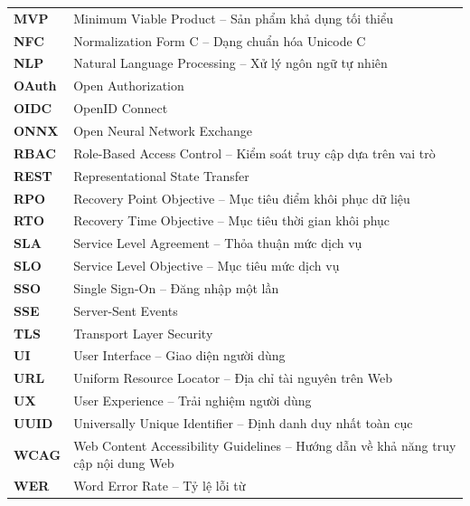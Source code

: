 \begin{longtable}{>{\bfseries}p{3cm} p{11cm}}
MVP      & Minimum Viable Product -- Sản phẩm khả dụng tối thiểu \\[4pt]
NFC      & Normalization Form C -- Dạng chuẩn hóa Unicode C \\[4pt]
NLP      & Natural Language Processing -- Xử lý ngôn ngữ tự nhiên \\[4pt]
OAuth    & Open Authorization \\[4pt]
OIDC     & OpenID Connect \\[4pt]
ONNX     & Open Neural Network Exchange \\[4pt]
RBAC     & Role-Based Access Control -- Kiểm soát truy cập dựa trên vai trò \\[4pt]
REST     & Representational State Transfer \\[4pt]
RPO      & Recovery Point Objective -- Mục tiêu điểm khôi phục dữ liệu \\[4pt]
RTO      & Recovery Time Objective -- Mục tiêu thời gian khôi phục \\[4pt]
SLA      & Service Level Agreement -- Thỏa thuận mức dịch vụ \\[4pt]
SLO      & Service Level Objective -- Mục tiêu mức dịch vụ \\[4pt]
SSO      & Single Sign-On -- Đăng nhập một lần \\[4pt]
SSE      & Server-Sent Events \\[4pt]
TLS      & Transport Layer Security \\[4pt]
UI       & User Interface -- Giao diện người dùng \\[4pt]
URL      & Uniform Resource Locator -- Địa chỉ tài nguyên trên Web \\[4pt]
UX       & User Experience -- Trải nghiệm người dùng \\[4pt]
UUID     & Universally Unique Identifier -- Định danh duy nhất toàn cục \\[4pt]
WCAG     & Web Content Accessibility Guidelines -- Hướng dẫn về khả năng truy cập nội dung Web \\[4pt]
WER      & Word Error Rate -- Tỷ lệ lỗi từ \\
\end{longtable}
\cleardoublepage
